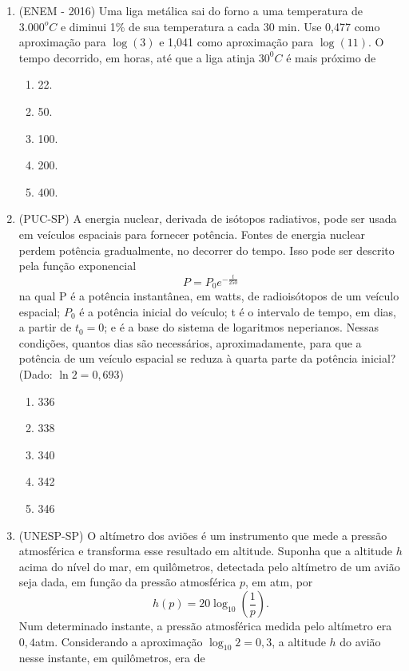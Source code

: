 \begin{enumerate}
\item \label{Exer12} (ENEM - 2016) Uma liga metálica sai do forno a uma temperatura de $3.000^o C$ e diminui 1{\%} de sua temperatura a 
cada 
30 min. Use 0,477 como aproximação para $\log (3)$ e 1,041 como aproximação para $\log (11)$. O tempo decorrido, em horas, até 
que a liga atinja $30^0 C$ é mais próximo de
\begin{enumerate}
    \item 22.
    \item 50.
    \item 100.
    \item 200.
    \item 400.
\end{enumerate}


\item \label{Exer13} (PUC-SP) A energia nuclear, derivada de isótopos radiativos, pode ser usada em veículos espaciais para fornecer 
potência. Fontes de energia nuclear perdem potência gradualmente, no decorrer do tempo. Isso pode ser descrito pela 
função exponencial
$$
P=P_0 e^{-\frac{t}{250}}
$$
na qual P é a potência instantânea, em watts, de radioisótopos de um veículo espacial; $P_0$ é a 
potência inicial do veículo; t é o intervalo de tempo, em dias, a partir de $t_0 = 0$; e é a base do sistema de 
logaritmos neperianos. Nessas condições, quantos dias são necessários, aproximadamente, para que a potência de um 
veículo espacial se reduza à quarta parte da potência inicial? (Dado: $\ln 2 = 0{,}693$)
 \begin{enumerate}
     \item 336
     \item 338
     \item 340
     \item 342
     \item 346
 \end{enumerate}

\item \label{Exer14} (UNESP-SP) O altímetro dos aviões é um instrumento que mede a pressão atmosférica e transforma esse resultado em 
altitude. Suponha que a altitude $h$ acima do nível do mar, em quilômetros, detectada pelo altímetro de um avião seja 
dada, em função da pressão atmosférica $p$, em atm, por
$$
h(p)=20\log_{10}\left(\frac{1}{p}\right).
$$
Num determinado instante, a pressão atmosférica medida pelo altímetro era $0{,}4$atm. Considerando a aproximação 
$\log_{10} 2 =0{,}3$, a altitude $h$ do avião nesse instante, em quilômetros, era de


\end{enumerate}
